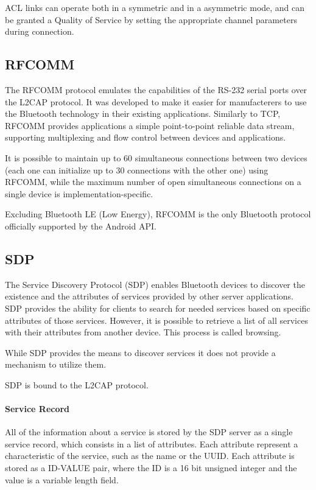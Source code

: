 ACL links can operate both in a symmetric and in a asymmetric mode, and can be granted a Quality of Service by setting the appropriate channel parameters during connection.

\subsection{RFCOMM}
The RFCOMM protocol \cite{RFCOMM} emulates the capabilities of the RS-232 serial ports over the L2CAP protocol. It was developed to make it easier for manufacterers to use the Bluetooth technology in their existing applications. Similarly to TCP, RFCOMM provides applications a simple point-to-point reliable data stream, supporting multiplexing and flow control between devices and applications.

It is possible to maintain up to 60 simultaneous connections between two devices (each one can initialize up to 30 connections with the other one) using RFCOMM, while the maximum number of open simultaneous connections on a single device is implementation-specific.

Excluding Bluetooth LE (Low Energy), RFCOMM is the only Bluetooth protocol officially supported by the Android API.

\subsection{SDP}
The Service Discovery Protocol (SDP) enables Bluetooth devices to discover the existence and the attributes of services provided by other server applications.
SDP provides the ability for clients to search for needed services based on specific attributes of those services. 
However, it is possible to retrieve a list of all services with their attributes from another device.
This process is called browsing.

While SDP provides the means to discover services it does not provide a mechanism to utilize them.

SDP is bound to the L2CAP protocol.

\paragraph{Service Record}
All of the information about a service is stored by the SDP server as a single service record, which consists in a list of attributes.
Each attribute represent a characteristic of the service, such as the name or the UUID. Each attribute is stored as a ID-VALUE pair, where the ID is a 16 bit unsigned integer and the value is a variable length field.